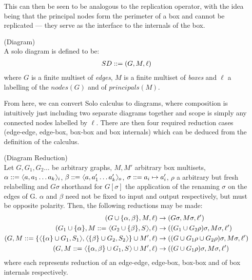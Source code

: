     This can then be seen to be analogous to the replication operator, with the idea being that the principal nodes form the perimeter of a box and cannot be replicated --- they serve as the interface to the internals of the box.


    \begin{definition}{(Diagram)\\}
        A solo diagram is defined to be:
        \begin{align}
            SD ::= (G, M, \ell)
        \end{align}
        where $G$ is a finite multiset of \textit{edges}, $M$ is a finite multiset of \textit{boxes} and $\ell$ a labelling of the $nodes(G)$ and of $principals(M)$.
    \end{definition}
    From here, we can convert Solo calculus to diagrams, where composition is intuitively just including two separate diagrams together and scope is simply any connected nodes labelled by $\ell$.
    There are then four required reduction cases (edge-edge, edge-box, box-box and box internals) which can be deduced from the definition of the calculus.


    \begin{definition}{(Diagram Reduction)\\}
        Let $G, G_1, G_2 \ldots$ be arbitrary graphs, $M, M'$ arbitrary box multisets, $\alpha \defeq \langl a, a_1 \ldots a_k\rangl_i$, $\beta \defeq \langl a, a_1' \ldots a_k'\rangl_o$, $\sigma ::= a_i \mapsto a_i'$, $\rho$ a arbitrary but fresh relabelling and $G\sigma$ shorthand for $G[\sigma]$ the application of the renaming $\sigma$ on the edges of G.
        $\alpha$ and $\beta$ need not be fixed to input and output respectively, but must be opposite polarity.
        Then, the following reductions may be made:
        \begin{align}
            (G \cup \{\alpha, \beta\}, M, \ell)                                                                             & \rightarrow (G\sigma, M\sigma, \ell') \\
            (G_1 \cup \{\alpha\}, M \defeq \langl G_2 \cup \{\beta\}, S\rangl, \ell)                                        & \rightarrow ((G_1 \cup G_2\rho)\sigma, M\sigma, \ell') \\
            (G, M \defeq \{\langl \{ \alpha \} \cup G_1, S_1\rangl,\langl \{ \beta \} \cup G_2, S_2\rangl\} \cup M', \ell)    & \rightarrow ((G \cup G_1\rho \cup G_2\rho)\sigma, M\sigma, \ell') \\
            (G, M \defeq \langl \{ \alpha, \beta \} \cup G_1, S\rangl \cup M', \ell)                                          & \rightarrow ((G \cup G_1\rho)\sigma, M\sigma, \ell')
        \end{align}
        where each represents reduction of an edge-edge, edge-box, box-box and of box internals respectively.
    \end{definition}


